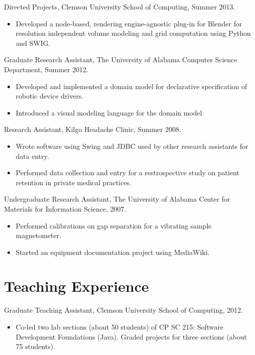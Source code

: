 \documentclass[12pt]{memoir}
\begin{document}
Directed Projects, Clemson University School of Computing, Summer 2013.

\begin{itemize}
  \item Developed a node-based, rendering engine-agnostic plug-in for Blender
        for resolution independent volume modeling and grid computation using Python
        and SWIG.
\end{itemize}

Graduate Research Assistant, The University of Alabama Computer Science
Department, Summer 2012.

\begin{itemize}
  \item Developed and implemented a domain model for declarative specification
        of robotic device drivers.
  \item Introduced a visual modeling language for the domain model.
\end{itemize}

Research Assistant, Kilgo Headache Clinic, Summer 2008.

\begin{itemize}
  \item Wrote software using Swing and JDBC used by other research assistants
        for data entry.
  \item Performed data collection and entry for a restrospective study on
        patient retention in private medical practices.
\end{itemize}

Undergraduate Research Assistant, The University of Alabama Center for
Materials for Information Science, 2007.

\begin{itemize}
  \item Performed calibrations on gap separation for a vibrating sample
        magnetometer.
  \item Started an equipment documentation project using MediaWiki.
\end{itemize}

\section*{Teaching Experience}

Graduate Teaching Assistant, Clemson University School of Computing, 2012.

\begin{itemize}
  \item Co-led two lab sections (about 50 students) of CP SC 215: Software
        Development Foundations (Java). Graded projects for three sections (about 75
        students).
\end{itemize}
\end{document}
